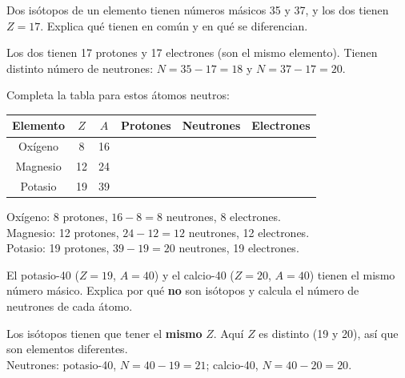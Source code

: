 \begin{exercise}
    Dos isótopos de un elemento tienen números másicos 35 y 37, y los dos tienen \(Z = 17\). Explica qué tienen en común y en qué se diferencian.
    \begin{solu}
        Los dos tienen 17 protones y 17 electrones (son el mismo elemento). Tienen distinto número de neutrones: \(N = 35 - 17 = 18\) y \(N = 37 - 17 = 20\).
    \end{solu}
\end{exercise}

\begin{exercise}
    Completa la tabla para estos átomos neutros:
    \begin{center}
        \renewcommand{\arraystretch}{1.3}
        \begin{tabular}{cccccc}
            \toprule
            \textbf{Elemento} & \(Z\) & \(A\) & \textbf{Protones} & \textbf{Neutrones} & \textbf{Electrones} \\
            \midrule
            Oxígeno & 8 & 16 & & & \\
            Magnesio & 12 & 24 & & & \\
            Potasio & 19 & 39 & & & \\
            \bottomrule
        \end{tabular}
    \end{center}
    \begin{solu}
        Oxígeno: 8 protones, \(16 - 8 = 8\) neutrones, 8 electrones. \\
        Magnesio: 12 protones, \(24 - 12 = 12\) neutrones, 12 electrones. \\
        Potasio: 19 protones, \(39 - 19 = 20\) neutrones, 19 electrones.
    \end{solu}
\end{exercise}

\begin{exercise}
    El potasio-40 (\(Z = 19\), \(A = 40\)) y el calcio-40 (\(Z = 20\), \(A = 40\)) tienen el mismo número másico. Explica por qué \textbf{no} son isótopos y calcula el número de neutrones de cada átomo.
    \begin{solu}
        Los isótopos tienen que tener el \textbf{mismo} \(Z\). Aquí \(Z\) es distinto (19 y 20), así que son elementos diferentes. \\
        Neutrones: potasio-40, \(N = 40 - 19 = 21\); calcio-40, \(N = 40 - 20 = 20\).
    \end{solu}
\end{exercise}

